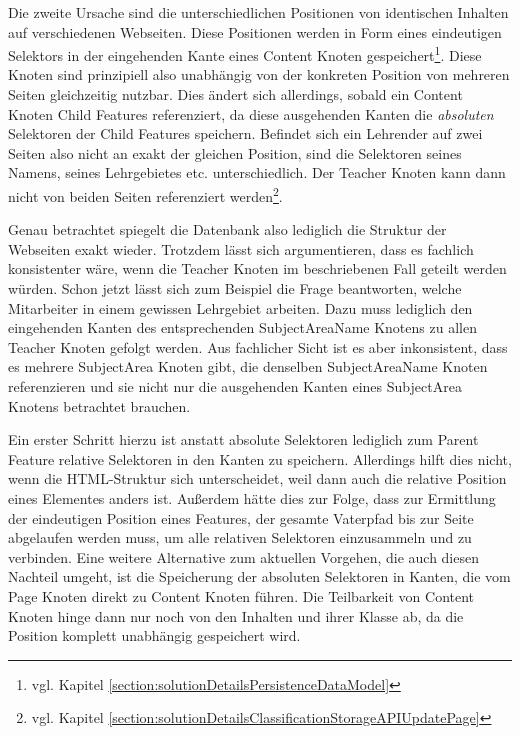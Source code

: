     Die zweite Ursache sind die unterschiedlichen Positionen von identischen Inhalten
    auf verschiedenen Webseiten.
    Diese Positionen werden in Form eines eindeutigen Selektors in der eingehenden
    Kante eines Content Knoten gespeichert\footnote{vgl. Kapitel \ref{section:solutionDetailsPersistenceDataModel}}.
    Diese Knoten sind prinzipiell also unabhängig von der konkreten Position
    von mehreren Seiten gleichzeitig nutzbar.
    Dies ändert sich allerdings, sobald ein Content Knoten Child Features referenziert,
    da diese ausgehenden Kanten die \textit{absoluten} Selektoren der Child Features speichern.
    Befindet sich ein Lehrender auf zwei Seiten also nicht an exakt der gleichen Position,
    sind die Selektoren seines Namens, seines Lehrgebietes etc. unterschiedlich.
    Der Teacher Knoten kann dann nicht von beiden Seiten referenziert
    werden\footnote{vgl. Kapitel \ref{section:solutionDetailsClassificationStorageAPIUpdatePage}}.
    
    Genau betrachtet spiegelt die Datenbank also lediglich die Struktur der Webseiten exakt wieder.
    Trotzdem lässt sich argumentieren, dass es fachlich konsistenter wäre,
    wenn die Teacher Knoten im beschriebenen Fall geteilt werden würden.
    Schon jetzt lässt sich zum Beispiel die Frage beantworten,
    welche Mitarbeiter in einem gewissen Lehrgebiet arbeiten.
    Dazu muss lediglich den eingehenden Kanten des entsprechenden
    SubjectAreaName Knotens zu allen Teacher Knoten gefolgt werden.
    Aus fachlicher Sicht ist es aber inkonsistent,
    dass es mehrere SubjectArea Knoten gibt,
    die denselben SubjectAreaName Knoten referenzieren und sie nicht
    nur die ausgehenden Kanten eines SubjectArea Knotens betrachtet brauchen.    

    Ein erster Schritt hierzu ist anstatt absolute Selektoren
    lediglich zum Parent Feature relative Selektoren in den Kanten zu speichern.
    Allerdings hilft dies nicht, wenn die HTML-Struktur sich unterscheidet,
    weil dann auch die relative Position eines Elementes anders ist.
    Außerdem hätte dies zur Folge, dass zur Ermittlung der eindeutigen Position
    eines Features, der gesamte Vaterpfad bis zur Seite abgelaufen werden muss,
    um alle relativen Selektoren einzusammeln und zu verbinden.
    Eine weitere Alternative zum aktuellen Vorgehen,
    die auch diesen Nachteil umgeht,
    ist die Speicherung der absoluten Selektoren in Kanten,
    die vom Page Knoten direkt zu Content Knoten führen.
    Die Teilbarkeit von Content Knoten hinge dann nur noch von den Inhalten und ihrer Klasse ab,
    da die Position komplett unabhängig gespeichert wird.
